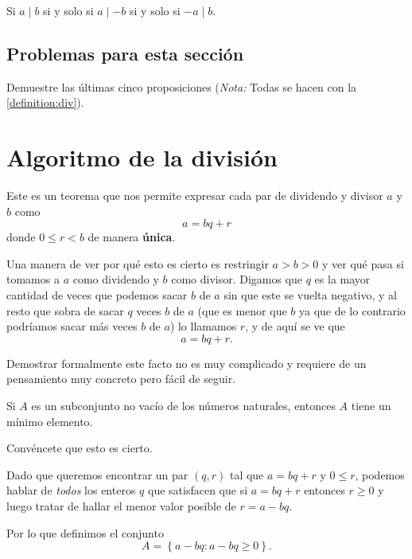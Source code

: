 \begin{proposition}
	Si $a \mid b$ si y solo si $a \mid -b$
	si y solo si $-a \mid b$.
\end{proposition}

\subsection*{Problemas para esta sección}
\begin{problem}
Demuestre las últimas cinco
proposiciones (\textit{Nota: } Todas se hacen
con la \autoref{definition:div}).
\end{problem}

\section{Algoritmo de la división}
Este es un teorema que nos permite expresar
cada par de dividendo y divisor $a$ y $b$
como
\[a = bq + r\]
donde $0 \leq r < b$ de manera \textbf{única}.

Una manera de ver por qué esto es cierto
es restringir $a > b > 0$ y ver qué pasa
si tomamos a $a$ como dividendo y $b$
como divisor.
Digamos que $q$ es la mayor cantidad de veces que
podemos sacar $b$ de $a$ sin que este se vuelta
negativo, y al resto que sobra de sacar $q$
veces $b$ de $a$ (que es menor que $b$
ya que de lo contrario podríamos sacar más veces $b$
de $a$)
lo llamamos $r$, y de aquí se ve que
\[a = bq + r.\]

Demostrar formalmente este facto no es muy
complicado y requiere de un pensamiento
muy concreto pero fácil de seguir.

\begin{proposition}
	\label{proposition:well_order}
	Si $A$ es un subconjunto no vacío
	de los números naturales, entonces $A$
	tiene un mínimo elemento.
\end{proposition}

\begin{question*}
	Convéncete que esto es cierto.
\end{question*}

Dado que queremos encontrar un par $(q, r)$
tal que $a = bq + r$ y $0 \leq r$,
podemos hablar de \textit{todos}
los enteros $q$ que satisfacen que si
$a = bq + r$ entonces $r \geq 0$
y luego tratar de hallar
el menor valor posible de $r = a - bq$.

Por lo que definimos el conjunto
\[A = \left\{a - bq \colon a - bq \geq 0\right\}.\]


